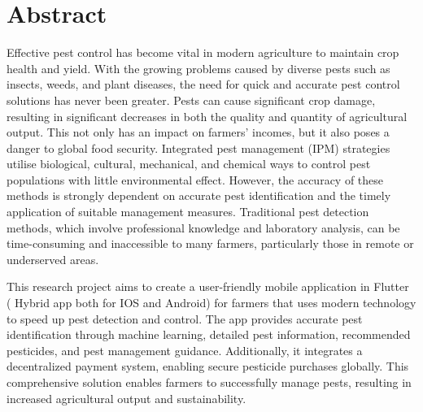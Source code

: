 \chapter*{\Large \center Abstract}

Effective pest control has become vital in modern agriculture to maintain crop health and yield. With the growing problems caused by diverse pests such as insects, weeds, and plant diseases, the need for quick and accurate pest control solutions has never been greater. Pests can cause significant crop damage, resulting in significant decreases in both the quality and quantity of agricultural output. This not only has an impact on farmers' incomes, but it also poses a danger to global food security.
Integrated pest management (IPM) strategies utilise biological, cultural, mechanical, and chemical ways to control pest populations with little environmental effect. However, the accuracy of these methods is strongly dependent on accurate pest identification and the timely application of suitable management measures. Traditional pest detection methods, which involve professional knowledge and laboratory analysis, can be time-consuming and inaccessible to many farmers, particularly those in remote or underserved areas.

This research project aims to create a user-friendly mobile application in Flutter ( Hybrid app both for IOS and Android) for farmers that uses modern technology to speed up pest detection and control. The app provides accurate pest identification through machine learning, detailed pest information, recommended pesticides, and pest management guidance. Additionally, it integrates a decentralized payment system, enabling secure pesticide purchases globally. This comprehensive solution enables farmers to successfully manage pests, resulting in increased agricultural output and sustainability.

